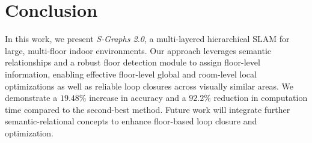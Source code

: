 \section{Conclusion}

In this work, we present \textit{S-Graphs 2.0}, a multi-layered hierarchical SLAM for large, multi-floor indoor environments. Our approach leverages semantic relationships and a robust floor detection module to assign floor-level information, enabling effective floor-level global and room-level local optimizations as well as reliable loop closures across visually similar areas. We demonstrate a $19.48\%$ increase in accuracy and a $92.2\%$ reduction in computation time compared to the second-best method. Future work will integrate further semantic-relational concepts to enhance floor-based loop closure and optimization.